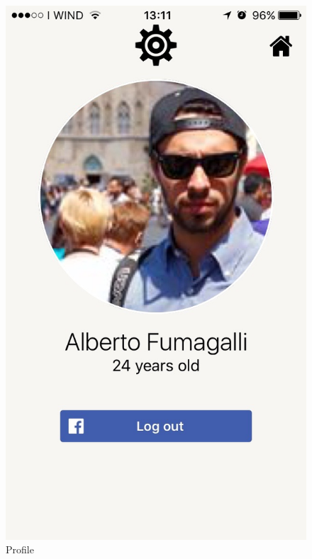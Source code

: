 \begin{multicols}{2}
\begin{figure}[H]
\centering
\centering
\includegraphics[scale=0.15]{./images/profile.jpg}
\caption{\label{Profile}Profile}
\end{figure}


\end{multicols}

